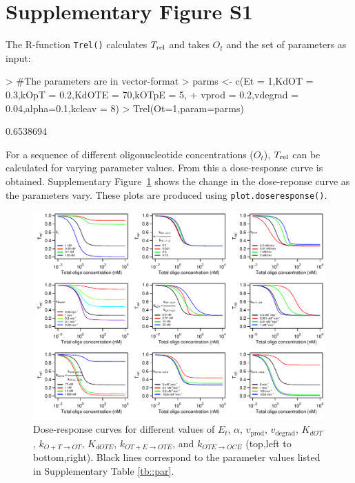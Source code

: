 \documentclass[a4paper,11pt]{article}
\newcommand{\ko}{k_{O+T \to OT}}
\newcommand{\kt}{k_{OT+E \to OTE}}
\newcommand{\kE}{k_{OTE \to OCE}}
\newcommand{\vp}{v_{\mathrm{prod}}}
\newcommand{\vd}{v_{\mathrm{degrad}}}
\newcommand{\Trel}{T_{\rm{rel}}}
\begin{document}
\section{Supplementary Figure S1}
The R-function \texttt{Trel()} calculates $\Trel$ and takes $O_t$ and the set of parameters as input:
\begin{Schunk}
\begin{Sinput}
> #The parameters are in vector-format
> parms <- c(Et = 1,KdOT = 0.3,kOpT = 0.2,KdOTE = 70,kOTpE = 5,	
+            vprod = 0.2,vdegrad = 0.04,alpha=0.1,kcleav = 8)
> Trel(Ot=1,param=parms)
\end{Sinput}
\begin{Soutput}
[1] 0.6538694
\end{Soutput}
\end{Schunk}
For a sequence of different oligonucleotide concentrations ($O_t$), $\Trel$ can be calculated for varying parameter values. From this a dose-response curve is obtained. Supplementary Figure~\ref{fig::Etot} shows the change in the dose-reponse curve as the parameters vary. These plots are produced using \texttt{plot.doseresponse()}.
\begin{figure}[!t]
\includegraphics[width=\textwidth]{SuppFile1-S1.pdf}
\caption{Dose-response curves for different values of $E_{t}$, $\alpha$, $\vp$, $\vd$, $K_{dOT}$, $\ko$, $K_{dOTE}$, $\kt$, and $\kE$ (top,left to bottom,right). Black lines correspond to the parameter values listed in Supplementary Table \ref{tb::par}.}\label{fig::Etot}
\end{figure}
\end{document}
